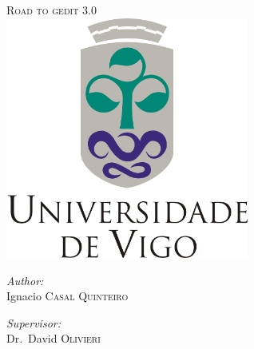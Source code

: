 
\begin{titlepage}

\begin{center}


\textsc{\LARGE Road to gedit 3.0}\\[2.0cm]

\includegraphics[width=0.60\textwidth]{./images/uvigo}\\[2cm]

\begin{minipage}{\textwidth}
\begin{flushleft} \large
\emph{Author:}\\
Ignacio \textsc{Casal Quinteiro}
\end{flushleft}
\end{minipage}

\begin{minipage}{\textwidth}
\begin{flushright} \large
\emph{Supervisor:} \\
Dr.~David \textsc{Olivieri}
\end{flushright}
\end{minipage}

\vfill

\end{center}

\end{titlepage}
